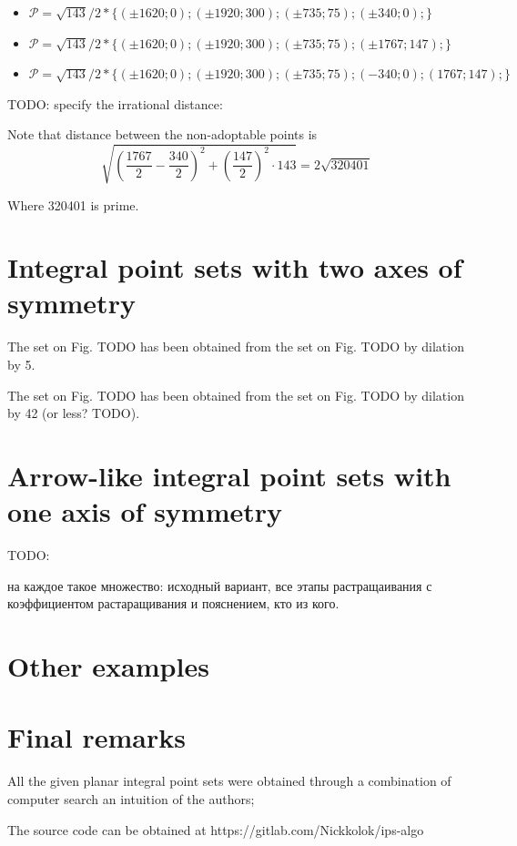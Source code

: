 \documentclass[12pt]{article}
\theoremstyle{theorem}
\theoremstyle{dfn}
\theoremstyle{remark}
\begin{document}
\begin{itemize}
\item
$\mathcal{P}=\sqrt{143}/2*\{
( \pm1620 ; 0);
( \pm1920 ; 300);
( \pm735 ; 75);
( \pm340 ; 0);
\}$

\item
$\mathcal{P}=\sqrt{143}/2*\{
( \pm1620 ; 0);
( \pm1920 ; 300);
( \pm735 ; 75);
( \pm1767 ; 147);
\}$

\item
$\mathcal{P}=
\sqrt{143}/2*\{
( \pm1620 ; 0);
( \pm1920 ; 300);
( \pm735 ; 75);
( -340 ; 0);
( 1767 ; 147);
\}$

\end{itemize}
TODO: specify the irrational distance:

Note that distance between the non-adoptable points is
\begin{equation}
	\sqrt{\left(\frac{1767}{2} - \frac{340}{2}\right)^2 + \left(\frac{147}{2}\right)^2\cdot143} = 2\sqrt{320401}
\end{equation}

Where 320401 is prime.

\section{Integral point sets with two axes of symmetry}



The set on Fig. TODO has been obtained from the set on Fig. TODO by dilation by 5.

The set on Fig. TODO has been obtained from the set on Fig. TODO by dilation by 42 (or less? TODO).

\section{Arrow-like integral point sets with one axis of symmetry}

TODO:

на каждое такое множество: исходный вариант, все этапы растращаивания с коэффициентом растаращивания и пояснением, кто из кого.


\section{Other examples}



\section{Final remarks}
All the given planar integral point sets were obtained through a combination of computer search an intuition of the authors;

The source code can be obtained at https://gitlab.com/Nickkolok/ips-algo

\printbibliography
\end{document}
